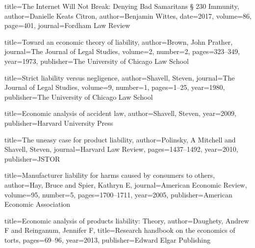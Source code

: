 
{
title={The Internet Will Not Break: Denying Bad Samaritans § 230 Immunity},
author={Danielle Keats Citron},
author={Benjamin Wittes},
date={2017},
volume=86,
page=401,
journal=Fordham Law Review
}



{
  title={Toward an economic theory of liability},
  author={Brown, John Prather},
  journal={The Journal of Legal Studies},
  volume={2},
  number={2},
  pages={323--349},
  year={1973},
  publisher={The University of Chicago Law School}
}

{
  title={Strict liability versus negligence},
  author={Shavell, Steven},
  journal={The Journal of Legal Studies},
  volume={9},
  number={1},
  pages={1--25},
  year={1980},
  publisher={The University of Chicago Law School}
}

{
  title={Economic analysis of accident law},
  author={Shavell, Steven},
  year={2009},
  publisher={Harvard University Press}
}


{
  title={The uneasy case for product liability},
  author={Polinsky, A Mitchell and Shavell, Steven},
  journal={Harvard Law Review},
  pages={1437--1492},
  year={2010},
  publisher={JSTOR}
}

{
  title={Manufacturer liability for harms caused by consumers to others},
  author={Hay, Bruce and Spier, Kathryn E},
  journal={American Economic Review},
  volume={95},
  number={5},
  pages={1700--1711},
  year={2005},
  publisher={American Economic Association}
}

{
  title={Economic analysis of products liability: Theory},
  author={Daughety, Andrew F and Reinganum, Jennifer F},
  title={Research handbook on the economics of torts},
  pages={69--96},
  year={2013},
  publisher={Edward Elgar Publishing}
}


